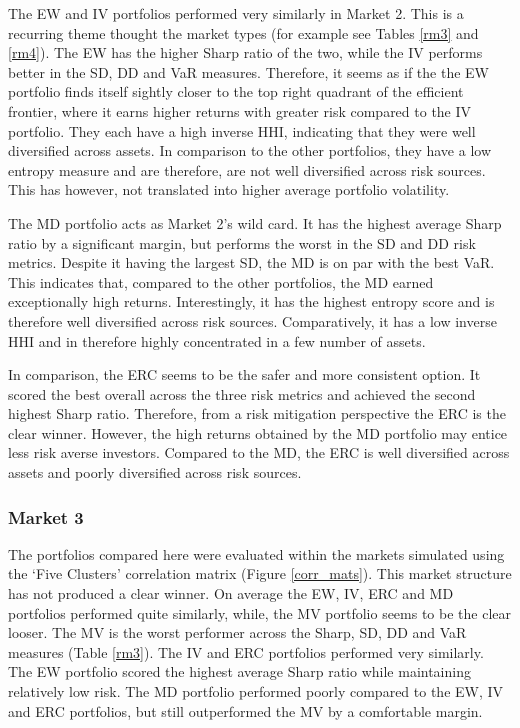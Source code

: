 \documentclass[11pt,preprint, authoryear]{elsarticle}
\numberwithin{equation}{section}
\numberwithin{figure}{section}
\numberwithin{table}{section}
\begin{document}
The EW and IV portfolios performed very similarly in Market 2. This is a
recurring theme thought the market types (for example see Tables
\ref{rm3} and \ref{rm4}). The EW has the higher Sharp ratio of the two,
while the IV performs better in the SD, DD and VaR measures. Therefore,
it seems as if the the EW portfolio finds itself sightly closer to the
top right quadrant of the efficient frontier, where it earns higher
returns with greater risk compared to the IV portfolio. They each have a
high inverse HHI, indicating that they were well diversified across
assets. In comparison to the other portfolios, they have a low entropy
measure and are therefore, are not well diversified across risk sources.
This has however, not translated into higher average portfolio
volatility.

The MD portfolio acts as Market 2's wild card. It has the highest
average Sharp ratio by a significant margin, but performs the worst in
the SD and DD risk metrics. Despite it having the largest SD, the MD is
on par with the best VaR. This indicates that, compared to the other
portfolios, the MD earned exceptionally high returns. Interestingly, it
has the highest entropy score and is therefore well diversified across
risk sources. Comparatively, it has a low inverse HHI and in therefore
highly concentrated in a few number of assets.

In comparison, the ERC seems to be the safer and more consistent option.
It scored the best overall across the three risk metrics and achieved
the second highest Sharp ratio. Therefore, from a risk mitigation
perspective the ERC is the clear winner. However, the high returns
obtained by the MD portfolio may entice less risk averse investors.
Compared to the MD, the ERC is well diversified across assets and poorly
diversified across risk sources.

\hypertarget{market-3}{%
\subsubsection{Market 3}\label{market-3}}

The portfolios compared here were evaluated within the markets simulated
using the `Five Clusters' correlation matrix (Figure \ref{corr_mats}).
This market structure has not produced a clear winner. On average the
EW, IV, ERC and MD portfolios performed quite similarly, while, the MV
portfolio seems to be the clear looser. The MV is the worst performer
across the Sharp, SD, DD and VaR measures (Table \ref{rm3}). The IV and
ERC portfolios performed very similarly. The EW portfolio scored the
highest average Sharp ratio while maintaining relatively low risk. The
MD portfolio performed poorly compared to the EW, IV and ERC portfolios,
but still outperformed the MV by a comfortable margin.
\end{document}
